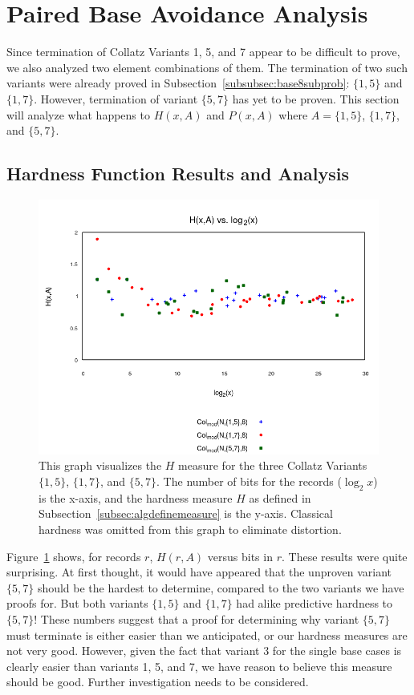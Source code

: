 \section{Paired Base Avoidance Analysis} \label{subsec:algpairedbase}
Since termination of Collatz Variants 1, 5, and 7 appear to be difficult to prove, we also analyzed two element combinations of them. The termination of two such variants were already proved in Subsection~\ref{subsubsec:base8subprob}: $\{1,5\}$ and $\{1,7\}$. However, termination of variant $\{5,7\}$ has yet to be proven. This section will analyze what happens to $H(x,A)$ and $P(x,A)$ where $A=\{1,5\}$, $\{1,7\}$, and $\{5,7\}$.
\subsection{Hardness Function Results and Analysis} \label{subsubsec:algmulhardness}
\begin{figure}
    \centering
    \includegraphics[scale=0.6]{ModAvoidanceAnalysisPics/H_vs_log_multi_base.png}
    \caption{This graph visualizes the $H$ measure for the three Collatz Variants $\{1,5\}$, $\{1,7\}$, and $\{5,7\}$. The number of bits for the records ($\log_2{x}$) is the x-axis, and the hardness measure $H$ as defined in Subsection~\ref{subsec:algdefinemeasure} is the y-axis. Classical hardness was omitted from this graph to eliminate distortion.}
    \label{fig:h_multivslog}
\end{figure}
Figure~\ref{fig:h_multivslog} shows, for records $r$, $H(r,A)$ versus bits in $r$. These results were quite surprising. At first thought, it would have appeared that the unproven variant $\{5, 7\}$ should be the hardest to determine, compared to the two variants we have proofs for. But both variants $\{1, 5\}$ and $\{1, 7\}$  had alike predictive hardness to $\{5, 7\}$! These numbers suggest that a proof for determining why variant $\{5, 7\}$ must terminate is either easier than we anticipated, or our hardness measures are not very good. However, given the fact that variant 3 for the single base cases is clearly easier than variants 1, 5, and 7, we have reason to believe this measure should be good. Further investigation needs to be considered.
